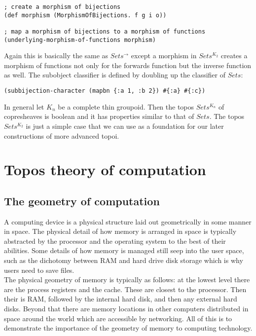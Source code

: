 \documentclass[a4paper,11pt]{report}
\begin{document}
\lstset {language=Lisp}
\begin{lstlisting}
; create a morphism of bijections
(def morphism (MorphismOfBijections. f g i o))

; map a morphism of bijections to a morphism of functions
(underlying-morphism-of-functions morphism)
\end{lstlisting}

Again this is basically the same as $Sets^{\to}$ except a morphism in $Sets^{K_2}$ creates a morphism of functions not only for the forwards function but the inverse function as well. The subobject classifier is defined by doubling up the classifier of $Sets$:

\lstset {language=Lisp}
\begin{lstlisting}
(subbijection-character (mapbn {:a 1, :b 2}) #{:a} #{:c})
\end{lstlisting}

In general let $K_n$ be a complete thin groupoid. Then the topos $Sets^{K_n}$ of copresheaves is boolean and it has properties similar to that of $Sets$. The topos $Sets^{K_2}$ is just a simple case that we can use as a foundation for our later constructions of more advanced topoi.
\newpage 

\chapter{Topos theory of computation}

\section{The geometry of computation}
A computing device is a physical structure laid out geometrically in some manner in space. The physical detail of how memory is arranged in space is typically abstracted by the processor and the operating system to the best of their abilities. Some details of how memory is managed still seep into the user space, such as the dichotomy between RAM and hard drive disk storage which is why users need to save files. \\

The physical geometry of memory is typically as follows: at the lowest level there are the process registers and the cache. These are closest to the processor. Then their is RAM, followed by the internal hard disk, and then any external hard disks. Beyond that there are memory locations in other computers distributed in space around the world which are accessible by networking. All of this is to demonstrate the importance of the geometry of memory to computing technology. \\
\end{document}
